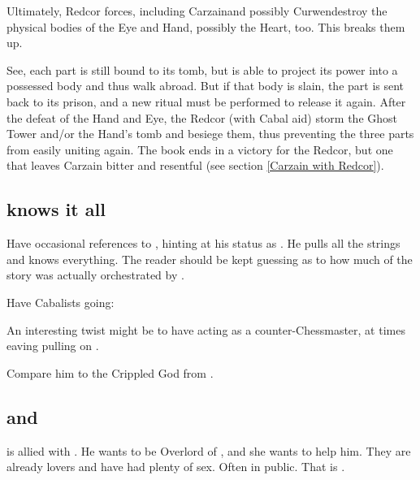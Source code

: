 Ultimately, Redcor forces, including Carzain\dash and possibly Curwen\dash destroy the physical bodies of the Eye and Hand, possibly the Heart, too. This breaks them up.

See, each part is still bound to its tomb, but is able to project its power into a possessed body and thus walk abroad. But if that body is slain, the \Haskelek{} part is sent back to its prison, and a new ritual must be performed to release it again. After the defeat of the Hand and Eye, the Redcor (with Cabal aid) storm the Ghost Tower and/or the Hand's tomb and besiege them, thus preventing the three parts from easily uniting again. The book ends in a victory for the Redcor, but one that leaves Carzain bitter and resentful (see section \ref{Carzain with Redcor}). 















\subsection{\Daggerrain{} knows it all}
Have occasional references to , hinting at his status as . He pulls all the strings and knows everything. The reader should be kept guessing as to how much of the story was actually orchestrated by \Daggerrain. 

Have Cabalists going: 

An interesting twist might be to have \Secherdamon{} acting as a counter-Chessmaster, at times eaving pulling  on \Daggerrain.

Compare him to the Crippled God from \cite{StevenEriksonIanCameronEsslemont:MalazanBookoftheFallen}. 









\subsection{\Cishiel{} and \Dasteron}
 is allied with . 
He wants to be Overlord of \Mystraacht, and she wants to help him. 
They are already lovers and have had plenty of sex. 
Often in public. 
That is . 





